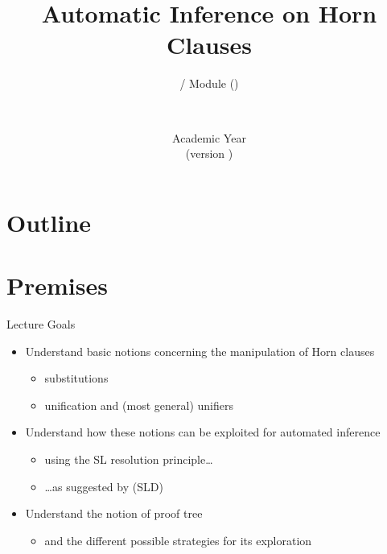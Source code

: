 \documentclass[presentation]{beamer}\mode<presentation>{\usetheme{AMSBolognaFC}}
\title[\currentLab{} -- Inference]{Automatic Inference on Horn Clauses}
\subtitle{\courseName{} / Module \moduleN{} (\courseAcronym)}
\author[\sspeaker{\gcShort}]{\speaker{\gcFull} \\ \gcEmail}
\institute[\disiShort, \uniboShort]{\disi{} (\disiShort)\\\unibo}
\date[A.Y. \academicYear{} (v.\ \version)]{Academic Year \academicYear{}\\(version \version)}
\begin{document}

\frame{\titlepage}

\section*{Outline}
%
\frame[c]{\tableofcontents[hideallsubsections]}

\section{Premises}

\begin{frame}{Lecture Goals}
    \begin{itemize}
        \item Understand basic notions concerning the \alert{manipulation} of Horn clauses
        \begin{itemize}
            \item substitutions
            \item unification and (most general) unifiers
        \end{itemize}

        \vfill

        \item Understand how these notions can be exploited for \alert{automated inference}
        \begin{itemize}
            \item using the SL resolution principle\ldots
            \item \ldots as suggested by \cite{KowVan1970} (SLD)
        \end{itemize}

        \vfill

        \item Understand the notion of \alert{proof tree}
        \begin{itemize}
            \item and the different possible strategies for its \alert{exploration}
        \end{itemize}
    \end{itemize}
\end{frame}
\end{document}
